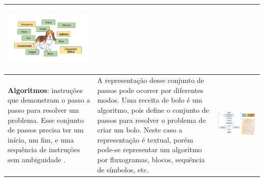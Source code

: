 \begin{landscape}
\begin{quadro}[!htbp]
\begin{center}
\begin{footnotesize}
\begin{tabular}{|p{6cm}|p{9cm}|p{5cm}|}
\begin{center}
                \includegraphics[width=1\linewidth]{figs/abstraction.png}    
            \end{center}
            
            \\ \hline
            \textbf{Algoritmos}: instruções que demonstram o passo a passo para resolver um problema. Esse conjunto de passos precisa ter um início, um fim, e uma sequência de instruções sem ambiguidade \cite{bbc_learning_what_2015}.
            
            &
            A representação desse conjunto de passos pode ocorrer por diferentes modos. Uma receita de bolo é um algoritmo, pois define o conjunto de passos para resolver o problema de criar um bolo. Neste caso a representação é textual, porém pode-se representar um algoritmo por fluxogramas, blocos, sequência de símbolos, etc.
            &
            \begin{center}
                \includegraphics[width=1\linewidth]{figs/algoritmo.png}    
            \end{center}
            
            \\ \hline
            
        \end{tabular}
         
        \end{footnotesize}
    \end{center} 
    \end{quadro}
\end{landscape}

